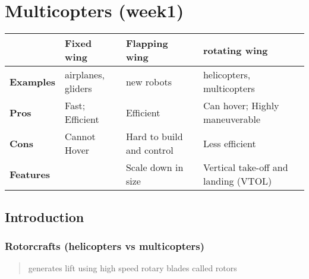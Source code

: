 \documentclass[]{article}
\begin{document}
\section{Multicopters (week1)}\label{header-n151}

\begin{longtable}[]{@{}llll@{}}
\toprule
& Fixed wing & Flapping wing & rotating wing\tabularnewline
\midrule
\endhead
\textbf{Examples} & airplanes, gliders & new robots & helicopters,
multicopters\tabularnewline
\textbf{Pros} & Fast; Efficient & Efficient & Can hover; Highly
maneuverable\tabularnewline
\textbf{Cons} & Cannot Hover & Hard to build and control & Less
efficient\tabularnewline
\textbf{Features} & & Scale down in size & Vertical take-off and landing
(VTOL)\tabularnewline
\bottomrule
\end{longtable}

\subsection{Introduction}\label{header-n178}

\subsubsection{Rotorcrafts (helicopters vs
multicopters)}\label{header-n179}

\begin{quote}
generates lift using high speed rotary blades called rotors
\end{quote}
\end{document}
